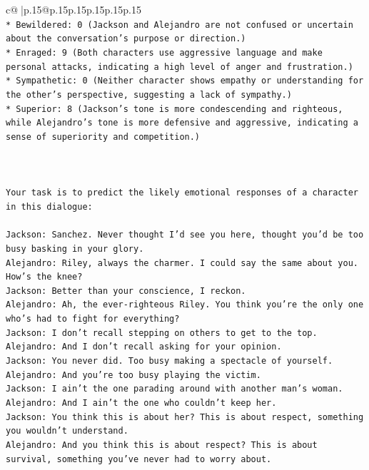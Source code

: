 \documentclass{article}
\begin{document}
{\begin{supertabular}{c@{$\;$}|p{.15\linewidth}@{}p{.15\linewidth}p{.15\linewidth}p{.15\linewidth}p{.15\linewidth}p{.15\linewidth}}
{{{\\ 
\texttt{* Bewildered: 0 (Jackson and Alejandro are not confused or uncertain about the conversation's purpose or direction.)} \\
\texttt{* Enraged: 9 (Both characters use aggressive language and make personal attacks, indicating a high level of anger and frustration.)} \\
\texttt{* Sympathetic: 0 (Neither character shows empathy or understanding for the other's perspective, suggesting a lack of sympathy.)} \\
\texttt{* Superior: 8 (Jackson's tone is more condescending and righteous, while Alejandro's tone is more defensive and aggressive, indicating a sense of superiority and competition.)} \\
\\ 
\\ 
\\ 
\texttt{Your task is to predict the likely emotional responses of a character in this dialogue:} \\
\\ 
\texttt{Jackson: Sanchez. Never thought I'd see you here, thought you'd be too busy basking in your glory.} \\
\texttt{Alejandro: Riley, always the charmer. I could say the same about you. How's the knee?} \\
\texttt{Jackson: Better than your conscience, I reckon.} \\
\texttt{Alejandro: Ah, the ever{-}righteous Riley. You think you're the only one who's had to fight for everything?} \\
\texttt{Jackson: I don't recall stepping on others to get to the top.} \\
\texttt{Alejandro: And I don't recall asking for your opinion.} \\
\texttt{Jackson: You never did. Too busy making a spectacle of yourself.} \\
\texttt{Alejandro: And you're too busy playing the victim. } \\
\texttt{Jackson: I ain't the one parading around with another man's woman.} \\
\texttt{Alejandro: And I ain't the one who couldn't keep her.} \\
\texttt{Jackson: You think this is about her? This is about respect, something you wouldn't understand.} \\
\texttt{Alejandro: And you think this is about respect? This is about survival, something you've never had to worry about.} \\
}}}
\end{supertabular}}
\end{document}
